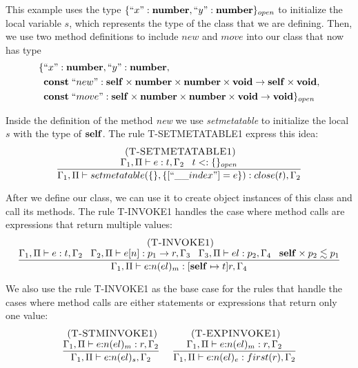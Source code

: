 This example uses the type $\{``x":\mathbf{number}, ``y":\mathbf{number}\}_{open}$ to
initialize the local variable $s$, which represents the type of the class
that we are defining.
Then, we use two method definitions to include $new$ and $move$ into
our class that now has type
\begin{align*}
\{ & ``x":\mathbf{number}, ``y":\mathbf{number},\\
   & \mathbf{const} \; ``new":\mathbf{self} \times \mathbf{number} \times \mathbf{number} \times \mathbf{void} \rightarrow \mathbf{self} \times \mathbf{void},\\
   & \mathbf{const} \; ``move":\mathbf{self} \times \mathbf{number} \times \mathbf{number} \times \mathbf{void} \rightarrow \mathbf{void} \}_{open}
\end{align*}

Inside the definition of the method \emph{new} we use \emph{setmetatable}
to initialize the local $s$ with the type of $\mathbf{self}$.
The rule \textsc{T-SETMETATABLE1} express this idea:
\[
\begin{array}{c}
\mylabel{T-SETMETATABLE1}\\
\dfrac{\env_{1}, \penv \vdash e:t, \env_{2} \;\;\;
       t \subtype \{\}_{open}}
      {\env_{1}, \penv \vdash setmetatable(\{\}, \{[``\string_\string_index"] = e\}):close(t), \env_{2}}
\end{array}
\]

After we define our class, we can use it to create object instances
of this class and call its methods.
The rule \textsc{T-INVOKE1} handles the case where method calls
are expressions that return multiple values:
\[
\begin{array}{c}
\; (\textsc{T-INVOKE1})\\
\dfrac{\Gamma_{1}, \Pi \vdash e:t, \Gamma_{2} \;\;\;
       \Gamma_{2}, \Pi \vdash e[n]:p_{1} \rightarrow r, \Gamma_{3} \;\;\;
       \Gamma_{3}, \Pi \vdash el:p_{2}, \Gamma_{4} \;\;\;
       \mathbf{self} \times p_{2} \lesssim p_{1}}
      {\Gamma_{1}, \Pi \vdash e{:}n(el)_{m}:[\mathbf{self} \mapsto t]r, \Gamma_{4}}
\end{array}
\]

We also use the rule \textsc{T-INVOKE1} as the base case for the rules
that handle the cases where method calls are either statements
or expressions that return only one value:
\[
\begin{array}{c}
\begin{array}{c}
\; (\textsc{T-STMINVOKE1})\\
\dfrac{\Gamma_{1}, \Pi \vdash e{:}n(el)_{m}:r, \Gamma_{2}}
      {\Gamma_{1}, \Pi \vdash e{:}n(el)_{s},\Gamma_{2}}
\end{array}
\;
\begin{array}{c}
\; (\textsc{T-EXPINVOKE1})\\
\dfrac{\Gamma_{1}, \Pi \vdash e{:}n(el)_{m}:r, \Gamma_{2}}
      {\Gamma_{1}, \Pi \vdash e{:}n(el)_{e}:first(r), \Gamma_{2}}
\end{array}
\end{array}
\]

